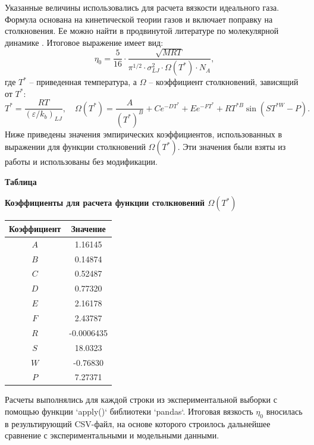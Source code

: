 \documentclass[a4paper,12pt]{article}
\newcommand{\TableNumberRight}{
  \refstepcounter{table}%
  \noindent\hfill\textbf{Таблица \thetable}
}
\begin{document}
      Указанные величины использовались для расчета вязкости идеального газа. Формула основана на кинетической теории газов и включает поправку на столкновения. Ее можно найти в продвинутой литературе по молекулярной динамике \cite{голубев2013вязкость}. Итоговое выражение имеет вид:
      \[
        \eta_0 = \frac{5}{16} \cdot \frac{\sqrt{MRT}}{\pi^{1/2} \cdot \sigma_{LJ}^2 \cdot \Omega(T^*) \cdot N_A},
      \]
      где $T^*$ -- приведенная температура, а $\Omega$ -- коэффициент столкновений, зависящий от $T^*$:
      \[
        T^* = \frac{RT}{(\varepsilon/k_b)_{LJ}}, \quad
      \Omega(T^*) = \frac{A}{(T^*)^B} + C e^{-D T^*} + E e^{-F T^*} + R T^{*B} \sin(S T^{*W} - P).
      \]
      Ниже приведены значения эмпирических коэффициентов, использованных в выражении для функции столкновений $\Omega(T^*)$. Эти значения были взяты из работы \cite{neufeld1972collision} и использованы без модификации.
      \begin{table}[ht]
        \TableNumberRight
        \begin{center}
          \textbf{Коэффициенты для расчета функции столкновений $\Omega(T^*)$}
          \vspace*{\fill}
        \end{center}
      
        \vspace{0.8ex}
        \noindent
        \begin{tabular}{|c|S|}
          \hline
          \textbf{Коэффициент} & {\textbf{Значение}} \\
          \hline
          $A$ & 1.16145 \\
          $B$ & 0.14874 \\
          $C$ & 0.52487 \\
          $D$ & 0.77320 \\
          $E$ & 2.16178 \\
          $F$ & 2.43787 \\
          $R$ & -0.0006435 \\
          $S$ & 18.0323 \\
          $W$ & -0.76830 \\
          $P$ & 7.27371 \\
          \hline
        \end{tabular}
        \label{tab:neufeld_coeffs}
      \end{table}
      
      Расчеты выполнялись для каждой строки из экспериментальной выборки с помощью функции `apply()` библиотеки `pandas`. Итоговая вязкость $\eta_0$ вносилась в результирующий CSV-файл, на основе которого строилось дальнейшее сравнение с экспериментальными и модельными данными.      
      
\end{document}
